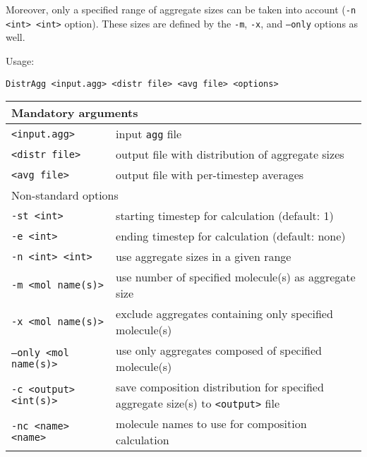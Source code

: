 Moreover, only a specified range of aggregate sizes can be taken into
account (\texttt{-n <int> <int>} option). These sizes are defined by the
\texttt{-m}, \texttt{-x}, and \texttt{--only} options as well.

Usage:

\vspace{1em}
\noindent
\texttt{DistrAgg <input.agg> <distr file> <avg file> <options>}

\noindent
\begin{longtable}{p{}p{}}
  \toprule
  \multicolumn{2}{l}{Mandatory arguments} \\
  \midrule
  \texttt{<input.agg>} & input \texttt{agg} file \\
  \texttt{<distr file>} & output file with distribution of aggregate
    sizes \\
  \texttt{<avg file>} & output file with per-timestep averages \\
  \toprule
  \multicolumn{2}{l}{Non-standard options} \\
  \midrule
  \texttt{-st <int>} & starting timestep for calculation (default: 1) \\
  \texttt{-e <int>} & ending timestep for calculation (default: none) \\
  \texttt{-n <int> <int>} & use aggregate sizes in a given range \\
  \texttt{-m <mol name(s)>} & use number of specified molecule(s) as
    aggregate size \\
  \texttt{-x <mol name(s)>} & exclude aggregates containing only specified
    mole\-cule(s) \\
  \texttt{--only <mol name(s)>} & use only aggregates composed of specified
    molecule(s) \\
  \texttt{-c <output> <int(s)>} & save composition distribution for
    specified aggregate size(s) to \texttt{<output>} file \\
  \texttt{-nc <name> <name>} & molecule names to use for composition
    calculation \\
  \bottomrule
\end{longtable}

